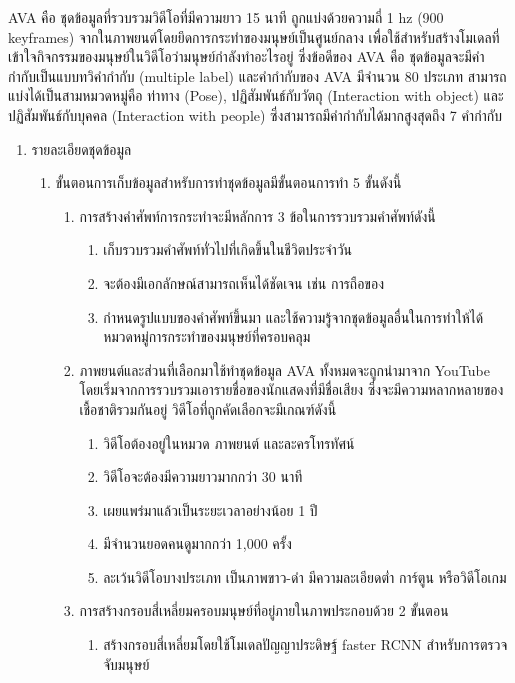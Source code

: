 AVA\textsuperscript{\cite{AVA}} คือ ชุดข้อมูลที่รวบรวมวิดีโอที่มีความยาว 15 นาที ถูกแบ่งด้วยความถี่ 1 hz (900 keyframes) จากในภาพยนต์โดยยึดการกระทำของมนุษย์เป็นศูนย์กลาง
เพื่อใช้สำหรับสร้างโมเดลที่เข้าใจกิจกรรมของมนุษย์ในวิดีโอว่ามนุษย์กำลังทำอะไรอยู่ ซึ่งข้อดีของ AVA คือ ชุดข้อมูลจะมีคำกำกับเป็นแบบทวิคำกำกับ (multiple label)
และคำกำกับของ AVA มีจำนวน 80 ประเภท สามารถแบ่งได้เป็นสามหมวดหมู่คือ ท่าทาง (Pose), ปฏิสัมพันธ์กับวัตถุ (Interaction with object) 
และปฏิสัมพันธ์กับบุคคล (Interaction with people) ซึ่งสามารถมีคำกำกับได้มากสูงสุดถึง 7 คำกำกับ
\begin{enumerate}
	\item {รายละเอียดชุดข้อมูล}
	\begin{enumerate}
		\item ขั้นตอนการเก็บข้อมูลสำหรับการทำชุดข้อมูลมีขั้นตอนการทำ 5 ขั้นดังนี้
		\begin{enumerate}
			\item การสร้างคำศัพท์การกระทำจะมีหลักการ 3 ข้อในการรวบรวมคำศัพท์ดังนี้
			\begin{enumerate}
				\item เก็บรวบรวมคำศัพท์ทั่วไปที่เกิดขึ้นในชีวิตประจำวัน
				\item จะต้องมีเอกลักษณ์สามารถเห็นได้ชัดเจน เช่น การถือของ
				\item กำหนดรูปแบบของคำศัพท์ขึ้นมา และใช้ความรู้จากชุดข้อมูลอื่นในการทำให้ได้หมวดหมู่การกระทำของมนุษย์ที่ครอบคลุม
			\end{enumerate}
			\item ภาพยนต์และส่วนที่เลือกมาใช้ทำชุดข้อมูล AVA ทั้งหมดจะถูกนำมาจาก YouTube โดยเริ่มจากการรวบรวมเอารายชื่อของนักแสดงที่มีชื่อเสียง
			ซึ่งจะมีความหลากหลายของเชื้อชาติรวมกันอยู่ วิดีโอที่ถูกคัดเลือกจะมีเกณฑ์ดังนี้
			\begin{enumerate}
				\item วิดีโอต้องอยู่ในหมวด ภาพยนต์ และละครโทรทัศน์
				\item วิดีโอจะต้องมีความยาวมากกว่า 30 นาที
				\item เผยแพร่มาแล้วเป็นระยะเวลาอย่างน้อย 1 ปี
				\item มีจำนวนยอดคนดูมากกว่า 1,000 ครั้ง
				\item ละเว้นวิดีโอบางประเภท เป็นภาพขาว-ดำ มีความละเอียดต่ำ การ์ตูน หรือวิดีโอเกม
			\end{enumerate}
			\item การสร้างกรอบสี่เหลี่ยมครอบมนุษย์ที่อยู่ภายในภาพประกอบด้วย 2 ขั้นตอน
			\begin{enumerate}
				\item สร้างกรอบสี่เหลี่ยมโดยใช้โมเดลปัญญาประดิษฐ์ faster RCNN สำหรับการตรวจจับมนุษย์

\end{enumerate}
\end{enumerate}
\end{enumerate}
\end{enumerate}
